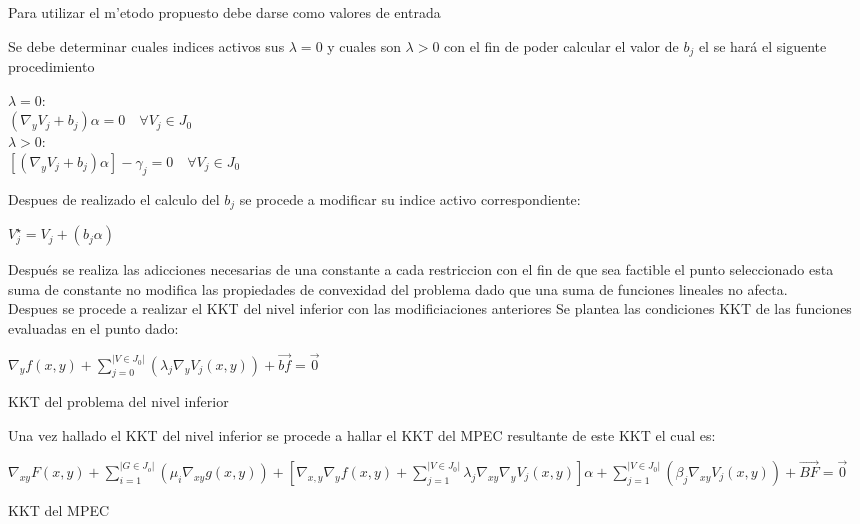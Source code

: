 Para utilizar el m'etodo propuesto debe darse como valores de entrada 


Se debe determinar cuales indices activos sus $\lambda = 0$ y cuales son $\lambda>0$ con el fin de poder calcular el valor de $b_j$ el se hará el siguente procedimiento

\begin{table}[H]
	$\lambda =0$:\\
	$(\nabla_{y}V_j+b_j)\alpha=0 \quad \forall V_j \in J_0$ \\
	$\lambda>0$:\\
	$[(\nabla_{y}V_j+b_j)\alpha]-\gamma_j=0 \quad \forall V_j \in J_0$


\end{table}

Despues de realizado el calculo del $b_j$ se procede a modificar su indice activo correspondiente:

\begin{table}[H]
	$V_{j}^{\star}=V_{j}+(b_j\alpha)$
\end{table}

Después se realiza las adicciones necesarias de una constante a cada restriccion con el fin de que sea factible el punto seleccionado
esta suma de constante no modifica las propiedades de convexidad del problema dado que una suma de funciones lineales no afecta.\\


Despues se procede a realizar el KKT del nivel inferior con las modificiaciones anteriores 
Se plantea las condiciones KKT de las funciones evaluadas en el punto dado:
\begin{table}[H]
	$\nabla_{y}f(x,y)+\sum_{j=0}^{|V \in J_0|}(\lambda_j\nabla_{y}V_j(x,y))+\vec{bf}=\vec{0}$
\caption*{KKT del problema del nivel inferior}
\end{table}


Una vez hallado el KKT del nivel inferior se procede a hallar el KKT del MPEC resultante de este KKT el cual es:

\begin{table}[H]
	$\nabla_{xy}F(x,y)+\sum_{i=1}^{|G \in J_o|}(\mu_i\nabla_{xy}g(x,y))+[\nabla_{x,y}\nabla_{y}f(x,y)+\sum_{j=1}^{|V \in J_0|}\lambda_j\nabla_{xy}\nabla_{y}V_j(x,y)]\alpha+\sum_{j=1}^{|V \in J_0|}(\beta_j\nabla_{xy}V_j(x,y))+\vec{BF}=\vec{0}$
\caption*{KKT del MPEC}
\end{table}


